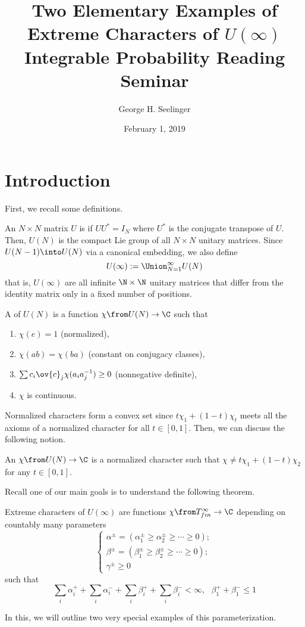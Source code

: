 \documentclass[11pt,leqno,oneside]{amsart}
\title[Two Elementary Examples of Extreme Characters of
  \(U(\infty)\)]{Two Elementary Examples of Extreme Characters of
  \(U(\infty)\) \\ Integrable Probability Reading Seminar}
\author{George H. Seelinger}
\date{February 1, 2019}
\numberwithin{thm}{section}
\begin{document}
\maketitle
\section{Introduction}
First, we recall some definitions.
\begin{defn}
  An \(N \times N\) matrix \(U\) is  if \(U U^* = I_N\)
  where \(U^*\) is the conjugate transpose of \(U\). Then, \(U(N)\) is
  the compact Lie group of all \(N \times N\) unitary matrices. Since
  \(U(N-1) \into U(N)\) via a canonical embedding, we also define \[
    U(\infty) := \Union_{N=1}^\infty U(N)
  \]
  that is, \(U(\infty)\) are all infinite \(\N \times \N\) unitary
  matrices that differ from the identity matrix only in a fixed number
  of positions.
\end{defn}
\begin{defn}
  A  of \(U(N)\) is a function \(\chi
  \from U(N) \to \C\) such that
  \begin{enumerate}
  \item \(\chi(e) = 1\) (normalized),
  \item \(\chi(ab) = \chi(ba)\) (constant on conjugacy classes),
  \item \(\sum c_i \ov{c}_j \chi(a_i a_j^{-1}) \geq 0\) (nonnegative
    definite),
  \item \(\chi\) is continuous.
  \end{enumerate}
\end{defn}
Normalized characters form a convex set since \(t \chi_1 + (1-t)
\chi_t\) meets all the axioms of a normalized character for all \(t
\in [0,1]\). Then, we can discuss the following notion.
\begin{defn}
  An  \(\chi \from U(N) \to \C\) is a normalized
  character such that \(\chi \neq t \chi_1 + (1-t) \chi_2\) for any
  \(t \in [0,1]\).
\end{defn}
Recall one of our main goals is to understand the following theorem.
\begin{thm}
  Extreme characters of \(U(\infty)\) are functions \(\chi \from
  T^\infty_{fin} \to \C\) depending on countably many parameters \[
    \begin{cases}
      \alpha^{\pm} = (\alpha_1^\pm \geq \alpha_2^\pm \geq \cdots \geq
      0); \\
      \beta^\pm = (\beta_1^\pm \geq \beta_2^\pm \geq \cdots \geq 0);
      \\
      \gamma^\pm \geq 0
    \end{cases}
  \]
  such that \[
    \sum_i \alpha_i^+ + \sum_i \alpha_i^- + \sum_i \beta_i^+ + \sum_i
    \beta_i^- < \infty, \ \ \ \beta_1^+ + \beta_1^- \leq 1
  \]
\end{thm}
In this, we will outline two very special examples of this
parameterization.
\end{document}
